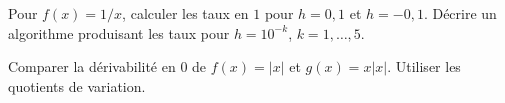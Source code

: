 \documentclass[11pt,a4paper]{article}
\begin{document}
\par\noindent\begin{minipage}{\linewidth}
Pour $f(x)=1/x$, calculer les taux en $1$ pour $h=0,1$ et $h=-0,1$. Décrire un algorithme produisant les taux pour $h=10^{-k}$, $k=1,\ldots,5$.
\end{minipage}\par
\par\noindent\begin{minipage}{\linewidth}
Comparer la dérivabilité en $0$ de $f(x)=|x|$ et $g(x)=x|x|$. Utiliser les quotients de variation.
\end{minipage}\par
\end{document}
